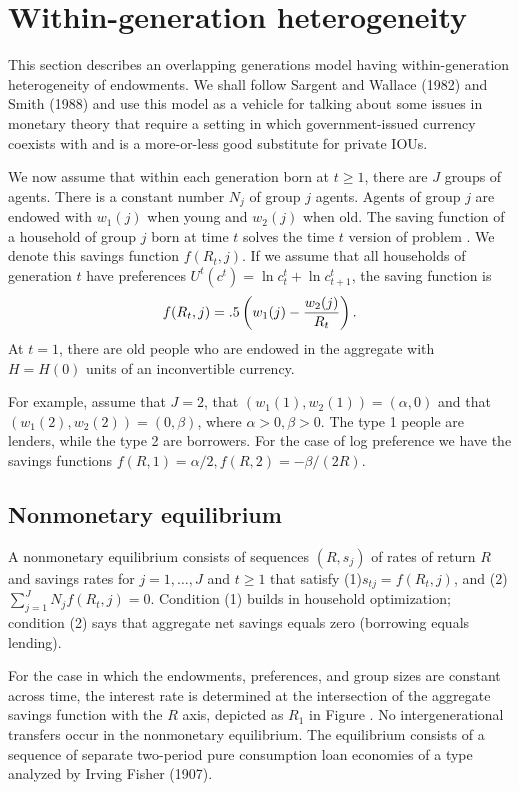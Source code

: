   
\section{Within-generation heterogeneity}
This section describes an overlapping generations
model having within-generation heterogeneity of
endowments.  We shall follow Sargent and Wallace  (1982)
and Smith (1988)
and use this model as a vehicle for talking about some
issues  in monetary theory that  require  a setting
in which government-issued  currency coexists with and is a more-or-less
 good substitute for
private IOUs.

We now assume  that
within each generation born at $t  \geq 1$,
there are $J$ groups of agents. There
is a constant number $N_j$ of group $j$ agents.  Agents of group
$j$ are endowed with $w_1(j)$ when young and
$w_2(j)$ when old.  The saving function
of a household of group $j$ born at time $t$
solves the time $t$ version of  problem
.    We denote this savings
function $f(R_t,j)$. If we  assume that all
households of generation $t$  have
preferences  $U^t(c^t) = \ln c_t^t + \ln c^t_{t+1}$,
the saving function is
$$ f(R_t,j) = .5\left( w_1(j) - {w_2(j)  \over R_t} \right).$$
At $t=1$, there are old people who are endowed in
the aggregate with $H = H(0)$ units of an inconvertible currency.

For example, assume that $J=2$, that $(w_1(1), w_2(1))  =
 (\alpha, 0)$ and that $
(w_1(2), w_2(2))   = (0,  \beta)$, where $\alpha >0, \beta >0$.
The type 1 people are lenders, while the type 2 are borrowers.
For the case of log preference we have the savings
functions
$f(R,1) = \alpha /2, f(R,2) = - \beta/(2R)$.

\subsection{Nonmonetary equilibrium}

 A nonmonetary equilibrium consists of sequences $(R, s_j)$ of rates of return $R$
and savings rates for  $j= 1, \ldots , J$  and $t \geq 1$ that satisfy
(1)$ s_{tj} = f(R_t, j)$, and (2)
$ \sum_{j=1}^J N_j f(R_t, j) =0   .$
Condition (1) builds in household optimization; condition
(2) says that aggregate net savings equals zero (borrowing
equals lending).

 For the case in which the endowments, preferences, and group
sizes are constant across time, the interest rate is determined
at the intersection of the aggregate savings function
with the $R$ axis, depicted as $R_1$ in Figure . %
 No intergenerational   transfers occur in the nonmonetary
equilibrium.  The equilibrium consists of a sequence of separate
 two-period pure consumption loan economies of a type
analyzed by Irving Fisher (1907).


